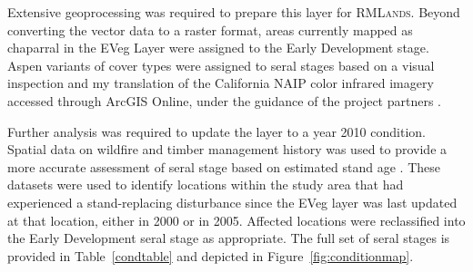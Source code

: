 Extensive geoprocessing was required to prepare this layer for \textsc{RMLands}. Beyond converting the vector data to a raster format, areas currently mapped as chaparral in the EVeg Layer were assigned to the Early Development stage. Aspen variants of cover types were assigned to seral stages based on a visual inspection and my translation of the California NAIP color infrared imagery accessed through ArcGIS Online, under the guidance of the project partners \citep{CaliforniaDepartmentofFishandWildlife2010}. 

Further analysis was required to update the layer to a year 2010 condition. Spatial data on wildfire and timber management history was used to provide a more accurate assessment of seral stage based on estimated stand age \citep{USDAForestService2012,USDAForestService2012a}. These datasets were used to identify locations within the study area that had experienced a stand-replacing disturbance since the EVeg layer was last updated at that location, either in 2000 or in 2005. Affected locations were reclassified into the Early Development seral stage as appropriate. The full set of seral stages is provided in Table~\ref{condtable} and depicted in Figure~\ref{fig:conditionmap}.


